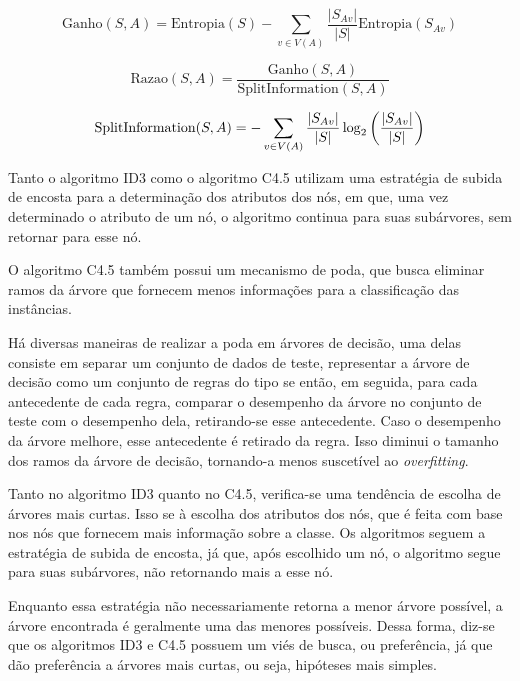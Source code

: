 \documentclass{article}
\begin{document}
\small
\begin{equation}
\mathrm{Ganho}(S,A)=\mathrm{Entropia}(S)-\sum_{v \in V(A)}\frac{\left|S_{Av}\right|}{\left|S\right|} \mathrm{Entropia}(S_{Av})
\end{equation}

\begin{equation}
\mathrm{Razao}(S,A)=\frac{\mathrm{Ganho}(S,A)}{\mathrm{SplitInformation}(S,A)}
\end{equation}

\begin{equation}
{\tiny \mathrm{SplitInformation}(S,A) = -\sum_{v\in V(A)} \frac{\left|S_{Av}\right|}{\left|S\right|} \log_2\left(\frac{\left|S_{Av}\right|}{\left|S\right|}\right)}
\end{equation}
\normalsize

Tanto o algoritmo ID3 como o algoritmo C4.5 utilizam uma estratégia de subida de encosta para a determinação dos atributos dos nós,
em que, uma vez determinado o atributo de um nó, o algoritmo continua para suas subárvores, sem retornar para esse nó.

O algoritmo C4.5 também possui um mecanismo de poda, que busca eliminar ramos da árvore que fornecem menos informações para a classificação das instâncias.

Há diversas maneiras de realizar a poda em árvores de decisão,
uma delas consiste em separar um conjunto de dados de teste,
representar a árvore de decisão como um conjunto de regras do tipo se então,
em seguida, para cada antecedente de cada regra, comparar o desempenho da árvore no conjunto de teste com o desempenho dela,
retirando-se esse antecedente. Caso o desempenho da árvore melhore, esse antecedente é retirado da regra.
Isso diminui o tamanho dos ramos da árvore de decisão, tornando-a menos suscetível ao {\it overfitting}.

Tanto no algoritmo ID3 quanto no C4.5,
verifica-se uma tendência de escolha de árvores mais curtas.
Isso se à escolha dos atributos dos nós, que é feita com base nos nós que fornecem mais informação sobre a classe.
Os algoritmos seguem a estratégia de subida de encosta,
já que, após escolhido um nó, o algoritmo segue para suas subárvores, não retornando mais a esse nó.

Enquanto essa estratégia não necessariamente retorna a menor árvore possível, a árvore encontrada é geralmente uma das menores possíveis. Dessa forma, diz-se que os algoritmos ID3 e C4.5 possuem um viés de busca, ou preferência, já que dão preferência a árvores mais curtas, ou seja, hipóteses mais simples. 
\end{document}
